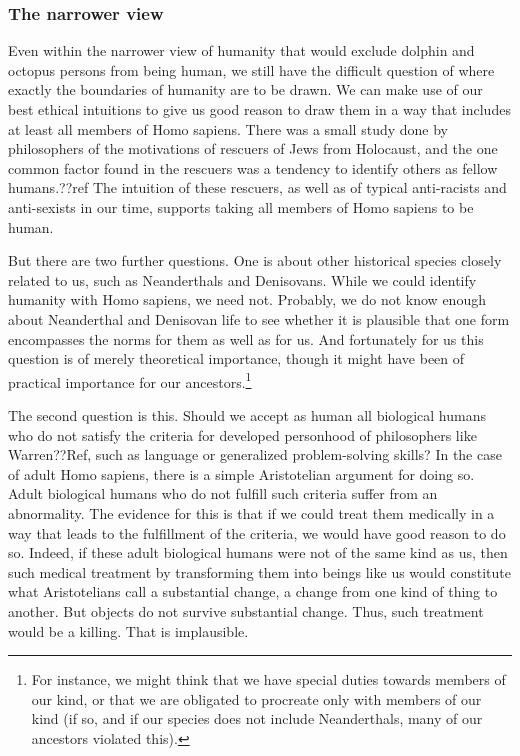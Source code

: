 \subsubsection{The narrower view}
Even within the narrower view of humanity that would exclude dolphin and octopus persons from being human, we still have the difficult question of where exactly the boundaries of humanity are to be drawn. 
We can make use of our best ethical intuitions to give us good reason to draw them in a way that includes at least all 
members of Homo sapiens. There was a small study done by philosophers of the motivations of rescuers of Jews from Holocaust, and the one common
factor found in the rescuers was a tendency to identify others as fellow humans.??ref The intuition of these rescuers, as well as of typical anti-racists and 
anti-sexists in our time, supports taking all members of Homo sapiens to be human. 

But there are two further questions. One is about other historical species closely related to us, such as Neanderthals and Denisovans. While we could
identify humanity with Homo sapiens, we need not. Probably, we do not know enough about Neanderthal and Denisovan life to see whether it is 
plausible that one form encompasses the norms for them as well as for us. And fortunately for us this question is of merely theoretical importance, 
though it might have been of practical importance for our ancestors.\footnote{For instance, we might think that we have
special duties towards members of our kind, or that we are obligated to procreate only with members of our kind (if so, and if 
our species does not include Neanderthals, many of our ancestors violated this).}

The second question is this. Should we accept as human all biological humans who do not satisfy the 
criteria for developed personhood of philosophers like Warren??Ref, such as language or generalized problem-solving skills? 
In the case of adult Homo sapiens, there is a simple Aristotelian argument for doing so. Adult biological humans who do not fulfill such criteria 
suffer from an abnormality. The evidence for this is that if we could treat them medically in a way that leads to the 
fulfillment of the criteria, we would have good reason to do so. Indeed, if these
adult biological humans were not of the same kind as us, then such medical treatment by transforming them into beings like us would constitute what Aristotelians
call a substantial change, a change from one kind of thing to another. But objects do not survive substantial change. Thus, such treatment would be a killing.
That is implausible.

